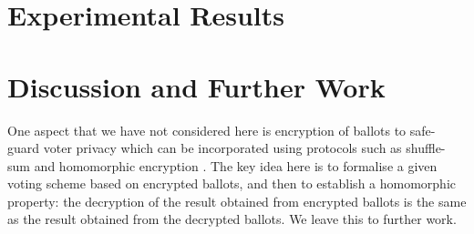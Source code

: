 \documentclass{llncs}
\begin{document}
\section{Experimental Results}


\section{Discussion and Further Work}



One aspect that we have not considered here is encryption of
ballots to safe-guard voter privacy which can be incorporated using
protocols such as shuffle-sum \cite{Benaloh:2009:SSC} and
homomorphic encryption \cite{Yi:2014:HEA}. The key idea here is to
formalise a given voting scheme based on encrypted ballots, and then
to establish a homomorphic property: the decryption of the result
obtained from encrypted ballots is the same as the result obtained from
the decrypted ballots.  We leave this to further work.



\end{document}
